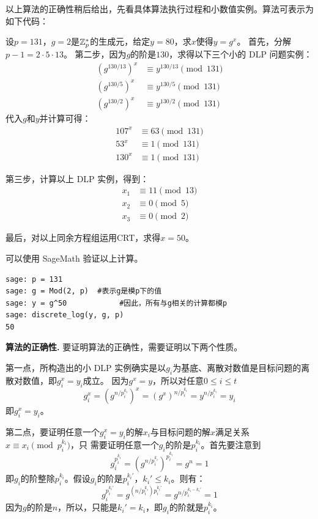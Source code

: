 以上算法的正确性稍后给出，先看具体算法执行过程和小数值实例。算法可表示为如下代码：
\begin{center}
	
\end{center}

\begin{example}
设$p=131$，$g = 2$是${\mathbb Z}_p^*$的生成元，给定$y = 80$，求$x$使得$y = g^x$。%
首先，分解$p -1 = 2 \cdot 5 \cdot 13$。
第二步，因为$g$的阶是$130$，求得以下三个小的 DLP 问题实例：
\begin{align*}
(g^{130/13})^x &\equiv y^{130/13} \pmod{131}\\
(g^{130/5})^x &\equiv y^{130/5} \pmod{131}\\
(g^{130/2})^x &\equiv y^{130/2} \pmod{131}
\end{align*}
代入$g$和$y$并计算可得：
\begin{align*}
 107^x &\equiv 63 \pmod{131}\\
 53^x &\equiv 1 \pmod{131}\\
 130^x &\equiv 1 \pmod{131}
\end{align*}

第三步，计算以上 DLP 实例，得到：
\begin{align*}
 x_1 &\equiv  11 \pmod{13}\\
 x_2 &\equiv 0 \pmod{5}\\
 x_3 &\equiv  0 \pmod{2}
\end{align*}

最后，对以上同余方程组运用CRT，求得$x = 50$。

可以使用 SageMath 验证以上计算。
\begin{lstlisting}
sage: p = 131
sage: g = Mod(2, p)  #表示g是模p下的值
sage: y = g^50            #因此，所有与g相关的计算都模p
sage: discrete_log(y, g, p)
50
\end{lstlisting}

\end{example}

\noindent \textbf{算法的正确性.} 要证明算法的正确性，需要证明以下两个性质。

第一点，所构造出的小 DLP 实例确实是以$g_i$为基底、离散对数值是目标问题的离散对数值，即$g_i^x = y_i$成立。
因为$g^x = y$，所以对任意$0 \leq i \leq t$
\[g_i^{x} = (g^{n/p_i^{k_i}})^x = (g^x)^{n/p_i^{k_i}} = y^{n/p_i^{k_i}} = y_i\]
即$g_i^x  = y_i$。

第二点，要证明任意一个$g_i^x  = y_i$的解$x_i$与目标问题的解$x$满足关系$x \equiv x_i \pmod{p_i^{k_i}}$，只
需要证明任意一个$g_i$的阶是$p_i^{k_i}$。首先要注意到
\[g_i^{p_i^{k_i}} = (g^{n/p_i^{k_i}})^{p_i^{k_i}} = g^n = 1 \]
即$g_i$的阶整除$p_i^{k_i}$。假设$g_i$的阶是$p_i^{k_i'}$，$k_i' \leq k_i$。则有：
\[g_i^{p_i^{k_i'}} =  g^{(n/p_i^{k_i})p_i^{k_i'}} = g^{n/p_i^{k_i - k_i'}} = 1\]
因为$g$的阶是$n$，所以，只能是$k_i' = k_i$，即$g_i$的阶就是$p_i^{k_i}$。

